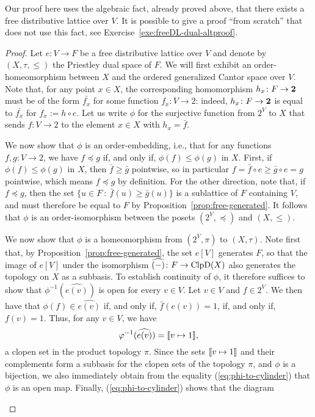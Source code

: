   Our proof here uses the algebraic fact, already proved above, that there exists a free distributive lattice over $V$. It is possible to give a proof ``from scratch'' that does not use this fact, see Exercise~\ref{exe:freeDL-dual-altproof}.
  \begin{proof}
  Let $e \colon V \to F$ be a free distributive lattice over $V$ and denote by $(X,\tau,\leq)$ the Priestley dual space of $F$. We will first exhibit an order-homeomorphism between $X$ and the ordered generalized Cantor space over $V$. Note that, for any point $x \in X$, the corresponding homomorphism $h_x \colon F \to {\bf 2}$ must be of the form $\bar{f_x}$ for some function $f_x \colon V \to 2$: indeed, $h_x \colon F \to {\bf 2}$ is equal to $\bar{f_x}$ for $f_x := h \circ e$. Let us write $\phi$ for the surjective function from $2^V$ to $X$ that sends $f \colon V \to 2$ to the element $x \in X$ with $h_x = \bar{f}$.%
  
  We now show that $\phi$ is an order-embedding, i.e., that for any functions $f, g \colon V \to 2$, we have $f \preceq g$ if, and only if, $\phi(f) \leq \phi(g)$ in $X$. First, if $\phi(f) \leq \phi(g)$ in $X$, then $\bar{f} \geq \bar{g}$ pointwise, so in particular $f = \bar{f} \circ e \geq \bar{g} \circ e = g$ pointwise, which means $f \preceq g$ by definition.
  For the other direction, note that, if $f \preceq g$, then the set $\{u \in F \ \colon \ \bar{f}(u) \geq \bar{g}(u)\}$ is a sublattice of $F$ containing $V$, and must therefore be equal to $F$ by Proposition~\ref{prop:free-generated}. It follows that $\phi$ is an order-isomorphism between the posets $(2^V, \preceq)$ and $(X,\leq)$.
  
  We now show that $\phi$ is a homeomorphism from $(2^V,\pi)$ to $(X,\tau)$. Note first that, by Proposition~\ref{prop:free-generated}, the set $e[V]$ generates $F$, so that the image of $e[V]$ under the isomorphism $\widehat{(-)} \colon F \to \mathrm{ClpD}(X)$ also generates the topology on $X$ as a subbasis. To establish continuity of $\phi$, it therefore suffices to show that $\phi^{-1}(\widehat{e(v)})$ is open for every $v \in V$. Let $v \in V$ and $f \in 2^V$. We then have that $\phi(f) \in \widehat{e(v)}$ if, and only if, $\bar{f}(e(v)) = 1$, if, and only if, $f(v) = 1$. Thus, for any $v \in V$, we have 
  \begin{equation}\label{eq:phi-to-cylinder}
    \varphi^{-1}(\widehat{e(v)}) = \llbracket {v \mapsto 1} \rrbracket,
  \end{equation} 
 a clopen set in the product topology $\pi$. Since the sets $\llbracket {v \mapsto 1} \rrbracket$ and their complements form a subbasis for the clopen sets of the topology $\pi$, and $\phi$ is a bijection, we also immediately obtain from the equality (\ref{eq:phi-to-cylinder}) that $\phi$ is an open map. Finally, (\ref{eq:phi-to-cylinder}) shows that the diagram
 \begin{center}
\end{center}
\end{proof}
